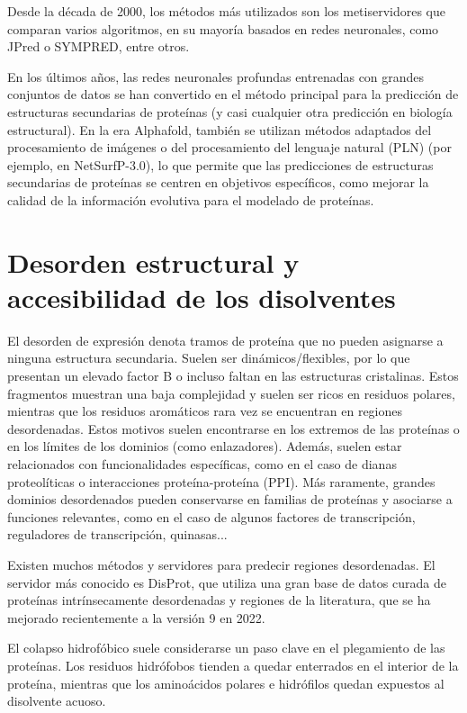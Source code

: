 Desde la década de 2000, los métodos más utilizados son los metiservidores que comparan varios algoritmos, en su mayoría basados en redes neuronales, como JPred o SYMPRED, entre otros.

En los últimos años, las redes neuronales profundas entrenadas con grandes conjuntos de datos se han convertido en el método principal para la predicción de estructuras secundarias de proteínas (y casi cualquier otra predicción en biología estructural). En la era Alphafold, también se utilizan métodos adaptados del procesamiento de imágenes o del procesamiento del lenguaje natural (PLN) (por ejemplo, en NetSurfP-3.0), lo que permite que las predicciones de estructuras secundarias de proteínas se centren en objetivos específicos, como mejorar la calidad de la información evolutiva para el modelado de proteínas.

\section{Desorden estructural y accesibilidad de los disolventes}
El desorden de expresión denota tramos de proteína que no pueden asignarse a ninguna estructura secundaria. Suelen ser dinámicos/flexibles, por lo que presentan un elevado factor B o incluso faltan en las estructuras cristalinas. Estos fragmentos muestran una baja complejidad y suelen ser ricos en residuos polares, mientras que los residuos aromáticos rara vez se encuentran en regiones desordenadas. Estos motivos suelen encontrarse en los extremos de las proteínas o en los límites de los dominios (como enlazadores). Además, suelen estar relacionados con funcionalidades específicas, como en el caso de dianas proteolíticas o interacciones proteína-proteína (PPI). Más raramente, grandes dominios desordenados pueden conservarse en familias de proteínas y asociarse a funciones relevantes, como en el caso de algunos factores de transcripción, reguladores de transcripción, quinasas...

Existen muchos métodos y servidores para predecir regiones desordenadas. El servidor más conocido es DisProt, que utiliza una gran base de datos curada de proteínas intrínsecamente desordenadas y regiones de la literatura, que se ha mejorado recientemente a la versión 9 en 2022.

El colapso hidrofóbico suele considerarse un paso clave en el plegamiento de las proteínas. Los residuos hidrófobos tienden a quedar enterrados en el interior de la proteína, mientras que los aminoácidos polares e hidrófilos quedan expuestos al disolvente acuoso.

